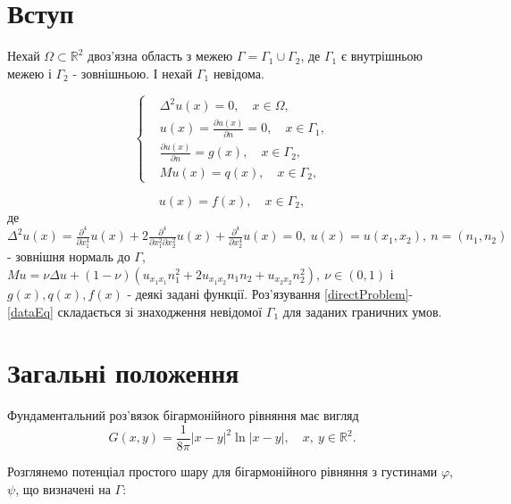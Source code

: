 \documentclass[12pt]{report}
\begin{document}
\tableofcontents


\chapter*{Вступ}
 
Нехай $\Omega\subset \mathbb{R}^2$ двоз'язна область з межею $\Gamma=\Gamma_1\cup\Gamma_2$, де $\Gamma_1$ є внутрішньою межею і $\Gamma_2$ - зовнішньою. І нехай $\Gamma_1$ невідома.

\begin{equation}
	\left\{
	\label{directProblem}
	\begin{split}
		&\Delta^2 u(x)=0, \quad x\in\Omega, \\
		&u(x)=\frac{\partial u(x)}{\partial n}=0, \quad x\in\Gamma_1, \\
		&\frac{\partial u(x)}{\partial n}=g(x), \quad x\in\Gamma_2, \\
		&Mu(x)=q(x), \quad x\in\Gamma_2,
	\end{split}
	\right.
\end{equation}

\begin{equation}
	\label{dataEq}
	u(x)=f(x), \quad x\in\Gamma_2,
\end{equation}
де $\Delta^{2}u(x)=\frac{\partial^{4}}{\partial x_1^4}u(x)+2\frac{\partial^{4}}{\partial x_1^2\partial x_2^2}u(x)+\frac{\partial^{4}}{\partial x_2^4}u(x)=0,\ u(x)=u(x_1,x_2), \ n=(n_1, n_2)$ - зовнішня нормаль до $\Gamma$, $Mu=\nu\Delta u+(1-\nu)(u_{x_1 x_1}n_1^2+2u_{x_1 x_2}n_1 n_2+u_{x_2 x_2}n_2^2), \ \nu\in (0, 1)$ і $g(x),q(x),f(x)$ - деякі задані функції. Роз'язування \eqref{directProblem}-\eqref{dataEq} складається зі знаходження невідомої $\Gamma_1$ для заданих граничних умов.

\setcounter{secnumdepth}{1}
\chapter{Загальні положення}

Фундаментальний роз'вязок бігармонійного рівняння має вигляд
 \begin{equation}
 	G(x, y)=\frac{1}{8\pi}|x-y|^2\ln|x-y|, \quad x,\ y \in \mathbb{R}^2.
 \end{equation}

Розглянемо потенціал простого шару для бігармонійного рівняння з густинами $\varphi$, $\psi$, що визначені на $\Gamma$:
\end{document}

